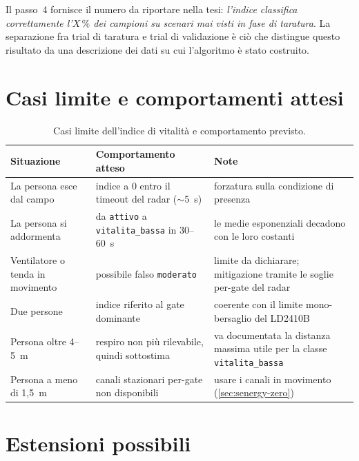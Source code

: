 Il passo~4 fornisce il numero da riportare nella tesi: \emph{l'indice classifica
correttamente l'$X\,\%$ dei campioni su scenari mai visti in fase di taratura}. La
separazione fra trial di taratura e trial di validazione è ciò che distingue questo
risultato da una descrizione dei dati su cui l'algoritmo è stato costruito.


\section{Casi limite e comportamenti attesi}
\label{sec:vitalita-limiti}

\begin{table}[htbp]
\centering
\caption{Casi limite dell'indice di vitalità e comportamento previsto.}
\label{tab:vitalita-casilimite}
\small
\begin{tabularx}{\textwidth}{@{}XXX@{}}
\toprule
\textbf{Situazione} & \textbf{Comportamento atteso} & \textbf{Note} \\
\midrule
La persona esce dal campo & indice a 0 entro il timeout del radar ($\sim$5~s) &
  forzatura sulla condizione di presenza \\
La persona si addormenta & da \texttt{attivo} a \texttt{vitalita\_bassa} in
  30--60~s & le medie esponenziali decadono con le loro costanti \\
Ventilatore o tenda in movimento & possibile falso \texttt{moderato} &
  limite da dichiarare; mitigazione tramite le soglie per-gate del radar \\
Due persone & indice riferito al gate dominante &
  coerente con il limite mono-bersaglio del LD2410B \\
Persona oltre 4--5~m & respiro non più rilevabile, quindi sottostima &
  va documentata la distanza massima utile per la classe
  \texttt{vitalita\_bassa} \\
Persona a meno di 1,5~m & canali stazionari per-gate non disponibili &
  usare i canali in movimento (\cref{sec:senergy-zero}) \\
\bottomrule
\end{tabularx}
\end{table}

\section{Estensioni possibili}

